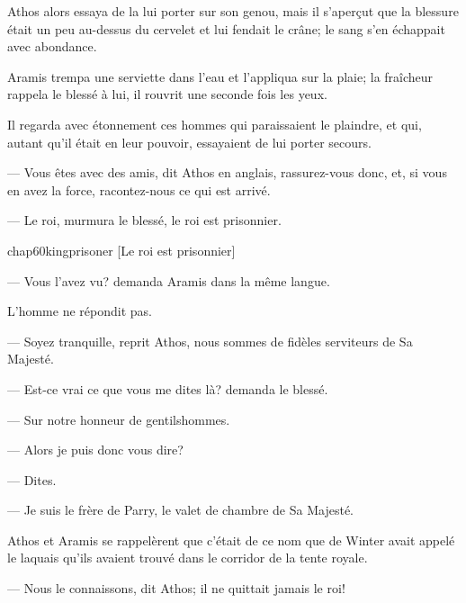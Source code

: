Athos alors essaya de la lui porter sur son genou, mais il s'aperçut que la blessure était un peu au-dessus du cervelet et lui fendait le crâne; le sang s'en échappait avec abondance.

Aramis trempa une serviette dans l'eau et l'appliqua sur la plaie; la fraîcheur rappela le blessé à lui, il rouvrit une seconde fois les yeux.

Il regarda avec étonnement ces hommes qui paraissaient le plaindre, et qui, autant qu'il était en leur pouvoir, essayaient de lui porter secours.

— Vous êtes avec des amis, dit Athos en anglais, rassurez-vous donc, et, si vous en avez la force, racontez-nous ce qui est arrivé.

— Le roi, murmura le blessé, le roi est prisonnier.

\begin{bwbigpic}
	[\basicscale] 
	{chap60kingprisoner}
	[Le roi est prisonnier]
\end{bwbigpic}

— Vous l'avez vu? demanda Aramis dans la même langue.

L'homme ne répondit pas.

— Soyez tranquille, reprit Athos, nous sommes de fidèles serviteurs de Sa Majesté.

— Est-ce vrai ce que vous me dites là? demanda le blessé.

— Sur notre honneur de gentilshommes.

— Alors je puis donc vous dire?

— Dites.

— Je suis le frère de Parry, le valet de chambre de Sa Majesté.

Athos et Aramis se rappelèrent que c'était de ce nom que de Winter avait appelé le laquais qu'ils avaient trouvé dans le corridor de la tente royale.

— Nous le connaissons, dit Athos; il ne quittait jamais le roi!

